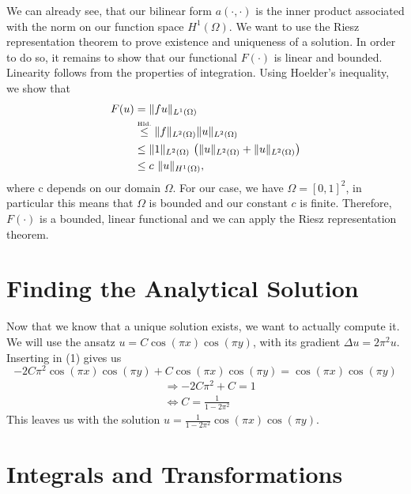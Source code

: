 \documentclass[a4paper,12pt]{article}
\begin{document}
We can already see, that our bilinear form $a(\cdotp ,\cdot)$ is the inner product associated with the norm on our function space $H^1(\Omega)$. We want to use the Riesz representation theorem to prove existence and uniqueness of a solution. In order to do so, it remains to show that our functional $F(\cdot)$ is linear and bounded. Linearity follows from the properties of integration. Using Hoelder's inequality, we show that
\begin{align*}
F(u)&=\|fu\|_{L^1(\Omega)}\\
	&\stackrel{\tiny\mbox{Hld.}}{\le} \|f\|_{L^2(\Omega)}\|u\|_{L^2(\Omega)}\\
	&\le \|1\|_{L^2(\Omega)}\ \big(\|u\|_{L^2(\Omega)}+\|u\|_{L^2(\Omega)}\big)\\
	&\le c\ \|u\|_{H^1(\Omega)}\mbox{,}
\end{align*}
where c depends on our domain $\Omega$. For our case, we have $\Omega=[0,1]^2$, in particular this means that $\Omega$ is bounded and our constant $c$ is finite. Therefore, $F(\cdot)$ is a bounded, linear functional and we can apply the Riesz representation theorem.

\section{Finding the Analytical Solution}

Now that we know that a unique solution exists, we want to actually compute it. We will use the ansatz $u=C\cos(\pi x)\cos(\pi y)$, with its gradient $\Delta u=2\pi^2 u$. Inserting in (1) gives us
\begin{equation}
-2C\pi^2 \cos(\pi x)\cos(\pi y) + C\cos(\pi x)\cos(\pi y)=\cos(\pi x)\cos(\pi y)
\end{equation}
\begin{align}
&\Rightarrow - 2C\pi^2 + C =1\\
&\Leftrightarrow C = \frac{1}{1-2\pi^2}
\end{align}
This leaves us with the solution $u=\frac{1}{1-2\pi^2}\cos(\pi x)\cos(\pi y)$.

\section{Integrals and Transformations}
\end{document}
